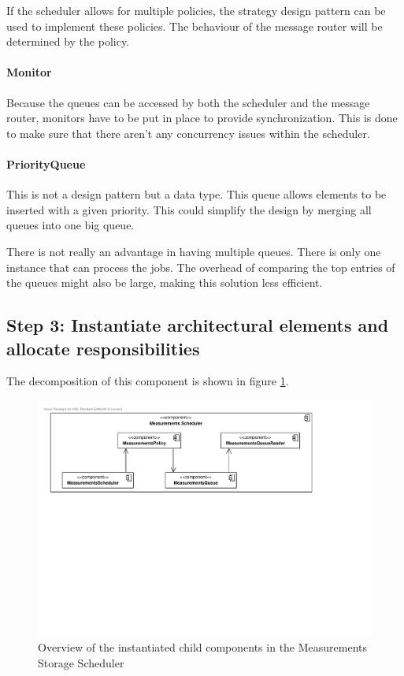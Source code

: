 \npar If the scheduler allows for multiple policies, the strategy design pattern
can be used to implement these policies. The behaviour of the message router
will be determined by the policy.

\paragraph{Monitor} 

\npar Because the queues can be accessed by both the scheduler and the message
router, monitors have to be put in place to provide synchronization. This is
done to make sure that there aren't any concurrency issues within the scheduler. 

\paragraph{PriorityQueue}

\npar This is not a design pattern but a data type. This queue allows elements
to be inserted with a given priority. This could simplify the design by merging
all queues into one big queue.

\npar There is not really an advantage in having multiple queues. There is only
one instance that can process the jobs. The overhead of comparing the top
entries of the queues might also be large, making this solution less efficient. 

\subsection{Step 3: Instantiate architectural elements and allocate responsibilities}
\label{add:it3/elements}

\npar The decomposition of this component is shown in figure
\ref{fig:it3/elements}. 

\begin{figure}[H]
	\begin{centering}
		\includegraphics[width=\textwidth]{figs/add-it3-elements.pdf}
		\caption{Overview of the instantiated child components in the Measurements
		Storage Scheduler}
		\label{fig:it3/elements}
	\end{centering}
\end{figure}

